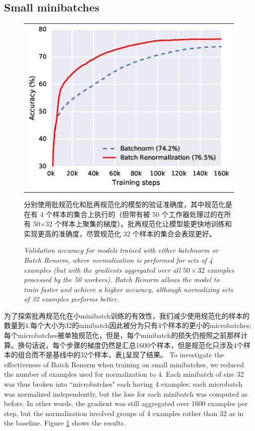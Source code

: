 \subsection{Small minibatches}
\begin{figure}
    \centering
    \begin{tabular}{@{}c@{}}
\includegraphics[width=\columnwidth]{small.eps}
\end{tabular}
    分别使用批规范化和批再规范化的模型的验证准确度，其中规范化是在有 4 个样本的集合上执行的（但带有被 50 个工作器处理过的在所有 50×32 个样本上聚集的梯度）。批再规范化让模型能更快地训练和实现更高的准确度，尽管规范化 32 个样本的集合会表现更好。
    \caption{\em Validation accuracy for models trained with either batchnorm or Batch Renorm, where normalization is performed for sets of 4 examples (but with the gradients aggregated over all $50\times 32$ examples processed by the 50 workers). Batch Renorm allows the model to train faster and achieve a higher accuracy, although normalizing sets of 32 examples performs better.
    }
    \label{fig-small}
\end{figure}
为了探索批再规范化在小minibatch训练的有效性，我们减少使用规范化的样本的数量到4.每个大小为32的minibatch因此被分为只有4个样本的更小的microbatches;每个microbatches被单独规范化，但是，每个minibatch的损失仍按照之前那样计算。换句话说，每个步骤的梯度仍然是汇总1600个样本，但是规范化只涉及4个样本的组合而不是基线中的32个样本，表\ref{fig-small}呈现了结果。
To investigate the effectiveness of Batch Renorm when training on small minibatches, we reduced the number of examples  used for normalization to 4. Each minibatch of size 32 was thus broken into ``microbatches" each having 4 examples; each microbatch was normalized independently, but the loss for each minibatch was computed as before. In other words, the gradient was still aggregated over 1600 examples per step, but the normalization involved groups of 4 examples rather than 32 as in the baseline. Figure \ref{fig-small} shows the results.

